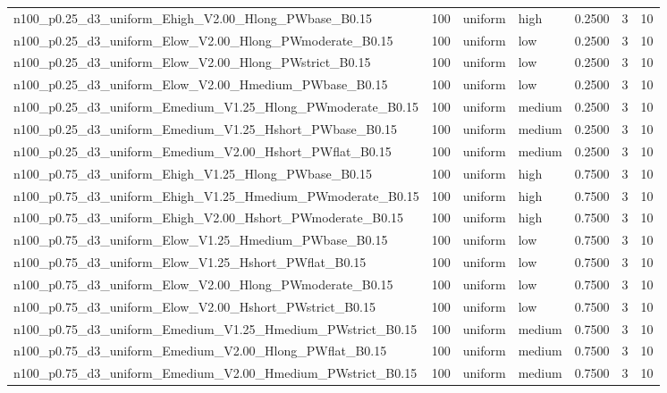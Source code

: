 \begin{tabular}{lrllrrr}
n100_p0.25_d3_uniform_Ehigh_V2.00_Hlong_PWbase_B0.15 & 100 & uniform & high & 0.2500 & 3 & 10 \\
n100_p0.25_d3_uniform_Elow_V2.00_Hlong_PWmoderate_B0.15 & 100 & uniform & low & 0.2500 & 3 & 10 \\
n100_p0.25_d3_uniform_Elow_V2.00_Hlong_PWstrict_B0.15 & 100 & uniform & low & 0.2500 & 3 & 10 \\
n100_p0.25_d3_uniform_Elow_V2.00_Hmedium_PWbase_B0.15 & 100 & uniform & low & 0.2500 & 3 & 10 \\
n100_p0.25_d3_uniform_Emedium_V1.25_Hlong_PWmoderate_B0.15 & 100 & uniform & medium & 0.2500 & 3 & 10 \\
n100_p0.25_d3_uniform_Emedium_V1.25_Hshort_PWbase_B0.15 & 100 & uniform & medium & 0.2500 & 3 & 10 \\
n100_p0.25_d3_uniform_Emedium_V2.00_Hshort_PWflat_B0.15 & 100 & uniform & medium & 0.2500 & 3 & 10 \\
n100_p0.75_d3_uniform_Ehigh_V1.25_Hlong_PWbase_B0.15 & 100 & uniform & high & 0.7500 & 3 & 10 \\
n100_p0.75_d3_uniform_Ehigh_V1.25_Hmedium_PWmoderate_B0.15 & 100 & uniform & high & 0.7500 & 3 & 10 \\
n100_p0.75_d3_uniform_Ehigh_V2.00_Hshort_PWmoderate_B0.15 & 100 & uniform & high & 0.7500 & 3 & 10 \\
n100_p0.75_d3_uniform_Elow_V1.25_Hmedium_PWbase_B0.15 & 100 & uniform & low & 0.7500 & 3 & 10 \\
n100_p0.75_d3_uniform_Elow_V1.25_Hshort_PWflat_B0.15 & 100 & uniform & low & 0.7500 & 3 & 10 \\
n100_p0.75_d3_uniform_Elow_V2.00_Hlong_PWmoderate_B0.15 & 100 & uniform & low & 0.7500 & 3 & 10 \\
n100_p0.75_d3_uniform_Elow_V2.00_Hshort_PWstrict_B0.15 & 100 & uniform & low & 0.7500 & 3 & 10 \\
n100_p0.75_d3_uniform_Emedium_V1.25_Hmedium_PWstrict_B0.15 & 100 & uniform & medium & 0.7500 & 3 & 10 \\
n100_p0.75_d3_uniform_Emedium_V2.00_Hlong_PWflat_B0.15 & 100 & uniform & medium & 0.7500 & 3 & 10 \\
n100_p0.75_d3_uniform_Emedium_V2.00_Hmedium_PWstrict_B0.15 & 100 & uniform & medium & 0.7500 & 3 & 10 \\
\bottomrule
\end{tabular}
